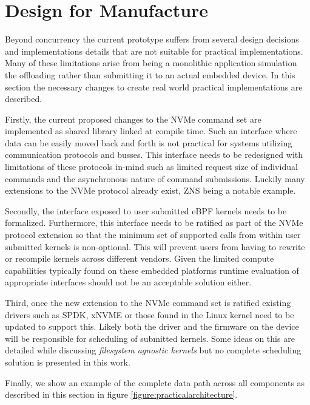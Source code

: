 \section{Design for Manufacture}

Beyond concurrency the current prototype suffers from several design decisions
and implementations details that are not suitable for practical implementations.
Many of these limitations arise from being a monolithic application simulation
the offloading rather than submitting it to an actual embedded device. In this
section the necessary changes to create real world practical implementations are
described.

Firstly, the current proposed changes to the NVMe command set are implemented as
shared library linked at compile time. Such an interface where data can be
easily moved back and forth is not practical for systems utilizing communication
protocols and busses. This interface needs to be redesigned with limitations of
these protocols in-mind such as limited request size of individual commands and
the asynchronous nature of command submissions. Luckily many extensions to
the NVMe protocol already exist, ZNS being a notable example.

Secondly, the interface exposed to user submitted eBPF kernels needs to be
formalized. Furthermore, this interface needs to be ratified as part of the NVMe
protocol extension so that the minimum set of supported calls from within 
user submitted kernels is non-optional. This will prevent users from having to
rewrite or recompile kernels across different vendors. Given the limited compute
capabilities typically found on these embedded platforms runtime evaluation of
appropriate interfaces should not be an acceptable solution either.

Third, once the new extension to the NVMe command set is ratified existing
drivers such as SPDK, xNVME or those found in the Linux kernel need to be
updated to support this. Likely both the driver and the firmware on the device
will be responsible for scheduling of submitted kernels. Some ideas on this are
detailed while discussing \textit{filesystem agnostic kernels} but no complete
scheduling solution is presented in this work.

Finally, we show an example of the complete data path across all components as
described in this section in figure \ref{figure:practicalarchitecture}.

